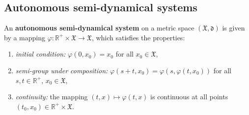 \documentclass[11pt]{beamer}
\begin{document}
\subsection{Autonomous semi-dynamical systems}
\begin{frame}
    \begin{definition}
        An \textbf{autonomous semi-dynamical system} on a metric space $(\mathfrak{X}, \mathfrak{d})$ is given by a mapping $\varphi \colon \mathbb{R}^+ \times \mathfrak{X} \to \mathfrak{X}$, which satisfies the properties:
        \begin{enumerate}[i]
            \item \textit{initial condition:} 
                $\varphi(0, x_0) = x_0$ for all $x_0 \in \mathfrak{X}$,
                \item \textit{semi-group under composition:} 
                $\varphi(s + t, x_0) = \varphi(s, \varphi(t, x_0))$ for all $s, t \in \mathbb{R}^+$, $x_0 \in \mathfrak{X}$,
                \item \textit{continuity:}
                the mapping $(t, x) \mapsto \varphi(t, x)$ is continuous at all points $(t_0, x_0) \in \mathbb{R}^+ \times \mathfrak{X}$.
        \end{enumerate}
        \end{definition}
\end{frame}



        

\end{document}
